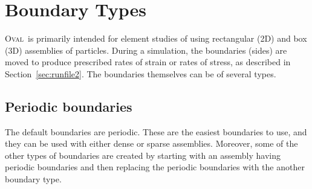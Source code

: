 \documentclass[letterpaper,11pt]{article}
\newcommand{\Oval}{\textsc{Oval}}
\begin{document}
\section{Boundary Types}\label{sec:Boundaries}
\Oval\ is primarily intended for element studies of using rectangular (2D) and
box (3D) assemblies of particles.
During a simulation, the boundaries (sides) are moved to produce
prescribed rates of strain or rates of stress, as described in 
Section~\ref{sec:runfile2}.
The boundaries themselves can be of several types.
%
\subsection{Periodic boundaries}\label{sec:Periodic}
The default boundaries are periodic.
These are the easiest boundaries to use, 
and they can be used with either dense or sparse assemblies.
Moreover, some of the other types of boundaries are created by starting
with an assembly having periodic boundaries and then replacing the
periodic boundaries with the another boundary type.
%
\end{document}

